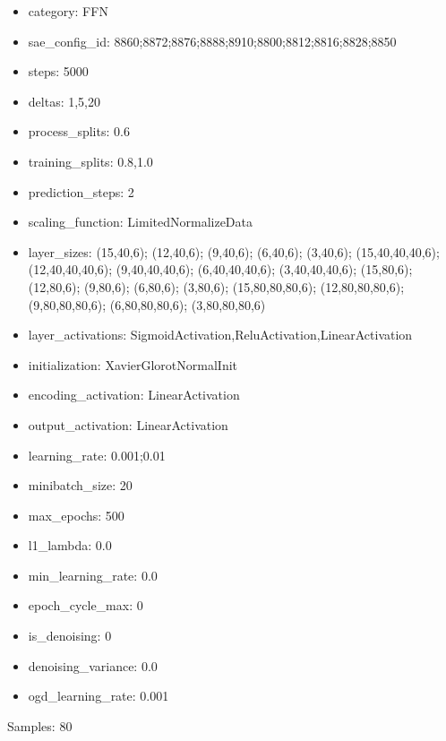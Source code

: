 \documentclass[a4paper,11pt,oneside]{article}
\theoremstyle{plain}
\theoremstyle{definition}
\begin{document}
	\begin{itemize}
		\item category: FFN
		\item sae\_config\_id: 8860;8872;8876;8888;8910;8800;8812;8816;8828;8850
		\item steps: 5000
		\item deltas: 1,5,20
		\item process\_splits: 0.6
		\item training\_splits: 0.8,1.0
		\item prediction\_steps: 2
		\item scaling\_function: LimitedNormalizeData
		\item layer\_sizes: (15,40,6); (12,40,6); (9,40,6); (6,40,6); (3,40,6); (15,40,40,40,6); (12,40,40,40,6); (9,40,40,40,6); (6,40,40,40,6); (3,40,40,40,6); (15,80,6);(12,80,6); (9,80,6); (6,80,6); (3,80,6); (15,80,80,80,6); (12,80,80,80,6); (9,80,80,80,6); (6,80,80,80,6); (3,80,80,80,6)
		\item layer\_activations: SigmoidActivation,ReluActivation,LinearActivation
		\item initialization: XavierGlorotNormalInit
		\item encoding\_activation: LinearActivation
		\item output\_activation: LinearActivation
		\item learning\_rate: 0.001;0.01
		\item minibatch\_size: 20
		\item max\_epochs: 500
		\item l1\_lambda: 0.0
		\item min\_learning\_rate: 0.0
		\item epoch\_cycle\_max: 0
		\item is\_denoising: 0
		\item denoising\_variance: 0.0
		\item ogd\_learning\_rate: 0.001
	\end{itemize}
	
	Samples: 80
	
\end{document}
